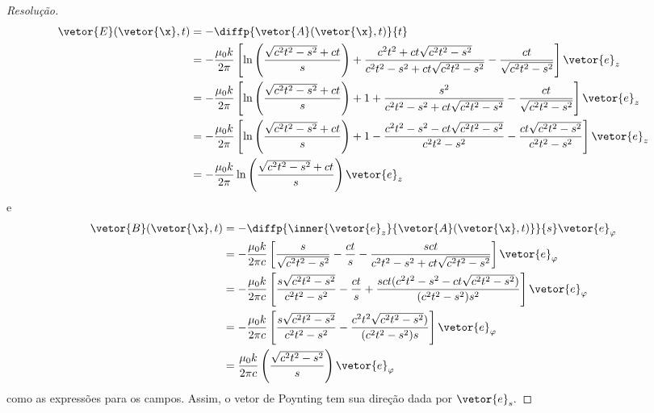 \begin{proof}[Resolução]
   \begin{align*}
      \vetor{E}(\vetor{\x}, t) &= -\diffp{\vetor{A}(\vetor{\x}, t)}{t}\\
      &= -\frac{\mu_0 k}{2\pi} \left[\ln\left(\frac{\sqrt{c^2 t^2 - s^2} + c t}{s}\right)  + \frac{c^2 t^2 + c t \sqrt{c^2 t^2 - s^2}}{c^2 t^2 - s^2 + c t{\sqrt{c^2 t^2 - s^2}}} - \frac{c t}{\sqrt{c^2 t^2 - s^2}}\right] \vetor{e}_z\\
      &= -\frac{\mu_0 k}{2\pi} \left[\ln\left(\frac{\sqrt{c^2 t^2 - s^2} + c t}{s}\right) + 1 + \frac{s^2}{c^2 t^2 - s^2 + c t{\sqrt{c^2 t^2 - s^2}}} - \frac{c t}{\sqrt{c^2 t^2 - s^2}}\right] \vetor{e}_z\\
      &= - \frac{\mu_0 k}{2\pi} \left[\ln\left(\frac{\sqrt{c^2 t^2 - s^2} + c t}{s}\right) + 1 - \frac{c^2 t^2 - s^2 - ct \sqrt{c^2 t^2 - s^2}}{c^2 t^2 - s^2} - \frac{ct\sqrt{c^2 t^2 - s^2}}{c^2 t^2 - s^2}\right]\vetor{e}_z\\
      &= - \frac{\mu_0 k}{2\pi} \ln\left(\frac{\sqrt{c^2 t^2 - s^2} + c t}{s}\right)\vetor{e}_z
   \end{align*}
   e
   \begin{align*}
      \vetor{B}(\vetor{\x}, t) &= -\diffp{\inner{\vetor{e}_z}{\vetor{A}(\vetor{\x}, t)}}{s}\vetor{e}_\varphi\\
      &=  -\frac{\mu_0 k}{2\pi c} \left[\frac{s}{\sqrt{c^2 t^2 - s^2}} - \frac{ct}{s} - \frac{s ct}{c^2 t^2  - s^2 + c t \sqrt{c^2 t^2 - s^2}}\right] \vetor{e}_\varphi\\
      &=-\frac{\mu_0 k}{2\pi c} \left[\frac{s\sqrt{c^2 t^2 - s^2}}{c^2 t^2 - s^2} - \frac{ct}{s} + \frac{s ct(c^2 t^2 - s^2 - ct \sqrt{c^2 t^2 - s^2})}{(c^2 t^2  - s^2)s^2}\right] \vetor{e}_\varphi\\
      &=-\frac{\mu_0 k}{2\pi c} \left[\frac{s\sqrt{c^2 t^2 - s^2}}{c^2 t^2 - s^2} - \frac{c^2 t^2\sqrt{c^2 t^2 - s^2})}{(c^2 t^2  - s^2)s}\right] \vetor{e}_\varphi\\
      &= \frac{\mu_0 k}{2\pi c} \left(\frac{\sqrt{c^2 t^2 - s^2}}{s}\right)\vetor{e}_\varphi
   \end{align*}
   como as expressões para os campos. Assim, o vetor de Poynting tem sua direção dada por \(\vetor{e}_s.\)
\end{proof}
